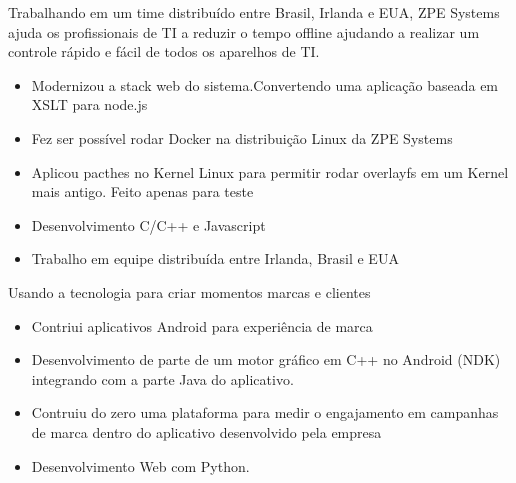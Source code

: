 \documentclass[10pt,a4paper]{altacv}
\begin{document}

\begin{fullwidth}
\makecvheader
\end{fullwidth}


Trabalhando em um time distribuído entre Brasil, Irlanda e EUA, ZPE Systems ajuda os profissionais de TI a reduzir o tempo offline ajudando a realizar um controle rápido e fácil de todos os aparelhos de TI.
\begin{itemize}
\item Modernizou a stack web do sistema.Convertendo uma aplicação baseada em XSLT para node.js 
\item Fez ser possível rodar Docker na distribuição Linux da ZPE Systems
\item Aplicou pacthes no Kernel Linux para permitir rodar overlayfs em um Kernel mais antigo. Feito apenas para teste
\item Desenvolvimento C/C++ e Javascript
\item Trabalho em equipe distribuída entre Irlanda, Brasil e EUA
\end{itemize}

\divider

Usando a tecnologia para criar momentos marcas e clientes
\begin{itemize}
\item Contriui aplicativos Android para experiência de marca
\item Desenvolvimento de parte de um motor gráfico em C++ no Android (NDK) integrando com a parte Java do aplicativo.
\item Contruiu do zero uma plataforma para medir o engajamento em campanhas de marca dentro do aplicativo desenvolvido pela empresa
\item Desenvolvimento Web com Python.
\end{itemize}
\end{document}

